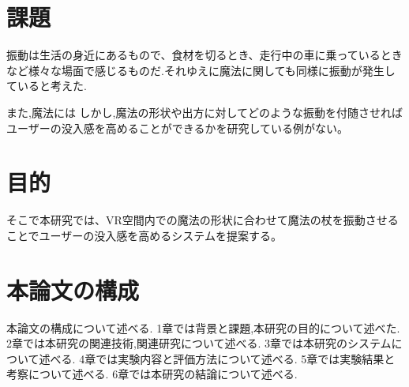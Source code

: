 \section{課題}
振動は生活の身近にあるもので、食材を切るとき、走行中の車に乗っているときなど様々な場面で感じるものだ.それゆえに魔法に関しても同様に振動が発生していると考えた.


また,魔法には
しかし,魔法の形状や出方に対してどのような振動を付随させればユーザーの没入感を高めることができるかを研究している例がない。



\section{目的}
そこで本研究では、VR空間内での魔法の形状に合わせて魔法の杖を振動させることでユーザーの没入感を高めるシステムを提案する。

\section{本論文の構成}
本論文の構成について述べる.
1章では背景と課題,本研究の目的について述べた.
2章では本研究の関連技術,関連研究について述べる.
3章では本研究のシステムについて述べる.
4章では実験内容と評価方法について述べる.
5章では実験結果と考察について述べる.
6章では本研究の結論について述べる.




\begin{comment}
    \textblockcolour{PowderBlue}
    \begin{textblock}{10}(6.5, 15.8)
        見出しの深さの最大値は研究室や分野によって異なる。
        
        教員の指示に従うこと。一般論として4段は深すぎ？
    \end{textblock}
\end{comment}
